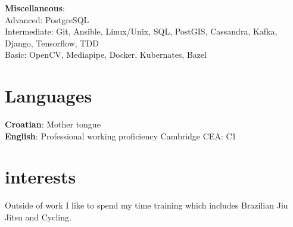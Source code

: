 \documentclass[a4paper]{article}
\begin{document}
\textbf{Miscellaneous}:\\
Advanced: PostgreSQL\\
Intermediate: Git, Ansible, Linux/Unix, SQL, PostGIS, Cassandra, Kafka, Django, Tensorflow, TDD\\
Basic: OpenCV, Mediapipe, Docker, Kubernates, Bazel\\


\section{Languages}
\textbf{Croatian}: Mother tongue\\
\textbf{English}: Professional working proficiency \hspace*{\fill} Cambridge CEA: C1


\section{interests}
Outside of work I like to spend my time training which includes Brazilian Jiu Jitsu and Cycling.
\end{document}
